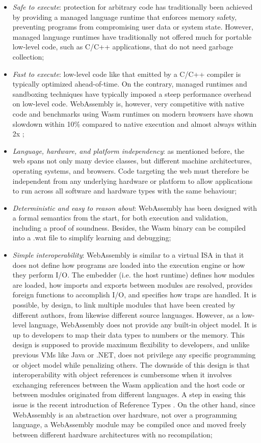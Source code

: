 \begin{itemize}
    \item \emph{Safe to execute}: protection for arbitrary code has traditionally been achieved by providing a managed language runtime that enforces memory safety, preventing programs from compromising user data or system state. However, managed language runtimes have traditionally not offered much for portable low-level code, such as C/C++ applications, that do not need garbage collection;
    \item \emph{Fast to execute}: low-level code like that emitted by a C/C++ compiler is typically optimized ahead-of-time. On the contrary, managed runtimes and sandboxing techniques have typically imposed a steep performance overhead on low-level code. WebAssembly is, however, very competitive with native code and benchmarks using Wasm runtimes on modern browsers have shown slowdown within 10\% compared to native execution and almost always within 2x \cite{wasm};
    \item \emph{Language, hardware, and platform independency}: as mentioned before, the web spans not only many device classes, but different machine architectures, operating systems, and browsers. Code targeting the web must therefore be independent from any underlying hardware or platform to allow applications to run across all software and hardware types with the same behaviour;
    \item \emph{Deterministic and easy to reason about}: WebAssembly has been designed with a formal semantics from the start, for both execution and validation, including a proof of soundness. Besides, the Wasm binary can be compiled into a .wat file to simplify learning and debugging;
    \item \emph{Simple interoperability}: WebAssembly is similar to a virtual ISA in that it does not define how programs are loaded into the execution engine or how they perform I/O. The embedder (i.e. the host runtime) defines how modules are loaded, how imports and exports between modules are resolved, provides foreign functions to accomplish I/O, and specifies how traps are handled. It is possible, by design, to link multiple modules that have been created by different authors, from likewise different source languages. However, as a low-level language, WebAssembly does not provide any built-in object model. It is up to developers to map their data types to numbers or the memory. This design is supposed to provide maximum flexibility to developers, and unlike previous VMs like Java or .NET, does not privilege any specific programming or object model while penalizing others. The downside of this design is that interoperability with object references is cumbersome when it involves exchanging references between the Wasm application and the host code or between modules originated from different languages. A step in easing this issue is the recent introduction of Reference Types \cite{reference-types}. On the other hand, since WebAssembly is an abstraction over hardware, not over a programming language, a WebAssembly module may be compiled once and moved freely between different hardware architectures with no recompilation;

\end{itemize}
